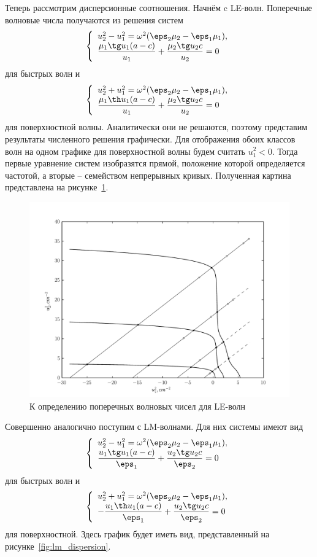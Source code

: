 Теперь рассмотрим дисперсионные соотношения. Начнём c LE-волн. Поперечные
волновые числа получаются из решения систем
\[
    \left\{
        \begin{array}{l}
            u_2^2 - u_1^2 = \omega^2(\eps_2\mu_2 - \eps_1\mu_1), \\
            \frac{\mu_1\tg u_1 (a-c)}{u_1} + \frac{\mu_2\tg u_2 c}{u_2}
            = 0
        \end{array}
    \right.
\]
для быстрых волн и
\[
    \left\{
        \begin{array}{l}
            u_2^2 + u_1^2 = \omega^2(\eps_2\mu_2 - \eps_1\mu_1), \\
            \frac{\mu_1\th u_1 (a-c)}{u_1} + \frac{\mu_2\tg u_2 c}{u_2} = 0
        \end{array}
    \right.
\]
для поверхностной волны. Аналитически они не решаются, поэтому представим
результаты численного решения графически. Для отображения обоих классов волн на
одном графике для поверхностной волны будем считать \( u_1^2 < 0 \). Тогда
первые уравнение систем изобразятся прямой, положение которой определяется
частотой, а вторые -- семейством непрерывных кривых. Полученная картина
представлена на рисунке~\ref{fig:le_dispersion}.

\begin{figure}[h]
    \center
    \includegraphics[width=.7\textwidth]{dispersion/le.png}
    \caption{К определению поперечных волновых чисел для LE-волн}
    \label{fig:le_dispersion}
\end{figure}


Совершенно аналогично поступим с LM-волнами. Для них системы имеют вид
\[
    \left\{
        \begin{array}{l}
            u_2^2 - u_1^2 = \omega^2(\eps_2\mu_2 - \eps_1\mu_1), \\
            \frac{u_1\tg u_1 (a-c)}{\eps_1} + \frac{u_2\tg u_2 c}{\eps_2}
            = 0
        \end{array}
    \right.
\]
для быстрых волн и
\[
    \left\{
        \begin{array}{l}
            u_2^2 + u_1^2 = \omega^2(\eps_2\mu_2 - \eps_1\mu_1), \\
            -\frac{u_1\th u_1 (a-c)}{\eps_1} + \frac{u_2\tg u_2 c}{\eps_2} = 0
        \end{array}
    \right.
\]
для поверхностной. Здесь график будет иметь вид, представленный на
рисунке~\ref{fig:lm_dispersion}.

